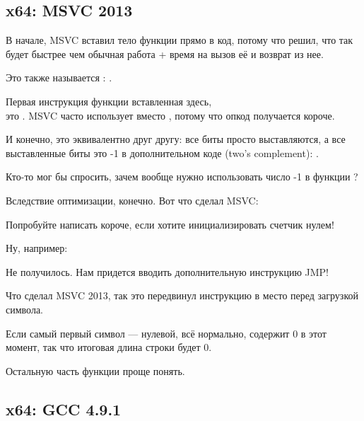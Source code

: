﻿\subsection{x64: \Optimizing MSVC 2013}



В начале, MSVC вставил тело функции \strlen{} прямо в код, потому что решил, что так будет
быстрее чем обычная работа \strlen{} + время на вызов её и возврат из нее.

Это также называется : .

\label{using_OR_instead_of_MOV}
Первая инструкция функции \strlen{} вставленная здесь,\\
это . 
MSVC часто использует  вместо , потому что опкод получается короче.

И конечно, это эквивалентно друг другу: все биты просто выставляются, а все выставленные
биты это -1 в дополнительном коде (two's complement): .

Кто-то мог бы спросить, зачем вообще нужно использовать число -1 в функции \strlen{}?

Вследствие оптимизации, конечно.
Вот что сделал MSVC:



Попробуйте написать короче, если хотите инициализировать счетчик нулем!

Ну, например:



Не получилось. Нам придется вводить дополнительную инструкцию JMP!

Что сделал MSVC 2013, так это передвинул инструкцию  в место перед загрузкой символа.

Если самый первый символ --- нулевой, всё нормально, \RAX содержит 0 в этот момент, так что
итоговая длина строки будет 0.

Остальную часть функции проще понять.

\subsection{x64: \NonOptimizing GCC 4.9.1}

